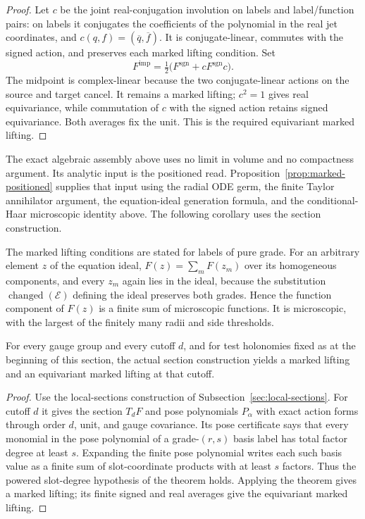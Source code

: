 \begin{proof}
Let $c$ be the joint real-conjugation involution on labels and
label/function pairs: on labels it conjugates the coefficients of the
polynomial in the real jet coordinates, and
$c(q,f)=(\overline q,\overline f)$. It is conjugate-linear, commutes
with the signed
action, and preserves each marked lifting condition. Set
\[
 F^{\mathrm{imp}}=\tfrac12\bigl(F^{\mathrm{sgn}}+
                           cF^{\mathrm{sgn}}c\bigr).
\]
The midpoint is complex-linear because the two conjugate-linear actions
on the source and target cancel. It remains a marked lifting; $c^2=1$ gives
real equivariance, while commutation of $c$ with the signed action retains
signed equivariance. Both averages fix the unit. This is the required
equivariant marked lifting.
\end{proof}

The exact algebraic assembly above uses no limit in volume and no
compactness argument. Its analytic input is the positioned read. Proposition~\ref{prop:marked-positioned} supplies that input using the
radial ODE germ, the finite Taylor annihilator argument, the equation-ideal
generation formula, and the conditional-Haar microscopic identity above.
The following corollary uses the section construction.

\begin{remark}\label{rem:marked-campaign-mixed}
The marked lifting conditions are stated for labels of pure grade. For an
arbitrary element $z$ of the equation ideal, $F(z)=\sum_mF(z_m)$ over
its homogeneous components, and every $z_m$ again lies in the ideal,
because the substitution $\operatorname{changed}(\mathcal E)$ defining
the ideal preserves both grades. Hence the function component of $F(z)$
is a finite sum of microscopic functions. It is microscopic, with the
largest of the finitely many radii and side thresholds.
\end{remark}

\begin{corollary}\label{cor:marked-campaign-actual}
For every gauge group and every cutoff $d$, and for test holonomies
fixed as at the beginning of this section, the actual section
construction yields a marked lifting and an equivariant marked lifting at that cutoff.
\end{corollary}
\begin{proof}
Use the local-sections construction of
Subsection~\ref{sec:local-sections}. For cutoff $d$ it gives the section
$T_dF$ and pose polynomials $P_\alpha$ with exact action forms through
order $d$, unit, and gauge covariance. Its pose certificate says that every
monomial in the pose polynomial of a grade-$(r,s)$ basis label has total
factor degree at least $s$. Expanding the finite pose polynomial writes each such basis value as
a finite sum of slot-coordinate products with at least $s$ factors. Thus
the powered slot-degree hypothesis of the theorem holds. Applying the
theorem gives a marked lifting; its finite signed and real averages give the
equivariant marked lifting.
\end{proof}
